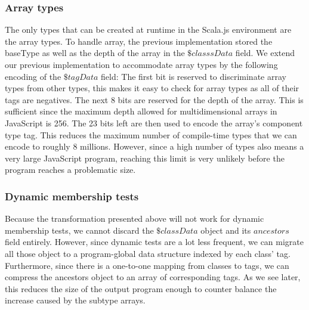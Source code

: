\subsubsection{Array types}
The only types that can be created at runtime in the Scala.js environment are
the array types. To handle array, the previous implementation stored the
baseType as well as the depth of the array in the $\$classsData$ field. We
extend our previous implementation to accommodate array types by the following
encoding of the $\$tagData$ field: The first bit is reserved to discriminate
array types from other types, this makes it easy to check for array types as
all of their tags are negatives. The next 8 bits are reserved for the depth of
the array. This is sufficient since the maximum depth allowed for
multidimensional arrays in JavaScript is 256. The 23 bits left are then
used to encode the array's component type tag. This reduces the maximum number
of compile-time types that we can encode to roughly 8 millions. However, since
a high number of types also means a very large JavaScript program, reaching
this limit is very unlikely before the program reaches a problematic size.

\subsubsection{Dynamic membership tests}
Because the transformation presented above will not work for dynamic membership
tests, we cannot discard the $\$classData$ object and its $ancestors$ field
entirely. However, since dynamic tests are a lot less frequent, we can migrate
all those object to a program-global data structure indexed by each class' tag.
Furthermore, since there is a one-to-one mapping from classes to tags, we can
compress the ancestors object to an array of corresponding tags. As we see
later, this reduces the size of the output program enough to counter balance
the increase caused by the subtype arrays.



